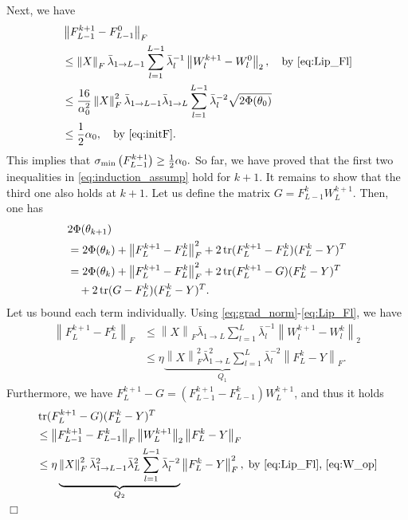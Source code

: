 \documentclass{article}
\newenvironment{proof}{\par\noindent{\bf Proof:\ }}{\hfill$\Box$\\[2mm]}
\newcommand{\norm}[1]{\left\|#1\right\|}
\newcommand{\svmin}[1]{\sigma_{\rm min}\left(#1\right)}
\def\tr{\mathop{\rm tr}\nolimits}
\begin{document}
\begin{proof}
    Next, we have
    \begin{align*}
	&\norm{F_{L-1}^{k+1}-F_{L-1}^0}_F\\
	&\leq\norm{X}_F \bar{\lambda}_{1\to L-1} \sum_{l=1}^{L-1} \bar{\lambda}_l^{-1} \norm{W_l^{k+1}-W_l^0}_2,\quad \textrm{by \eqref{eq:Lip_Fl}}\\
	&\leq\frac{16}{\alpha_0^2}\norm{X}_F^2 \bar{\lambda}_{1\to L-1} \bar{\lambda}_{1\to L} \sum_{l=1}^{L-1} \bar{\lambda}_l^{-2} \sqrt{2\Phi(\theta_0)} \\
	&\leq\frac{1}{2} \alpha_0, \quad \textrm{by \eqref{eq:initF}}.
    \end{align*}
    This implies that $\svmin{F_{L-1}^{k+1}}\geq \frac{1}{2}\alpha_0.$
    So far, we have proved that the first two inequalities in \eqref{eq:induction_assump} hold for $k+1.$
    It remains to show that the third one also holds at $k+1.$
    Let us define the matrix $G=F_{L-1}^k W_L^{k+1}.$  
    Then, one has
    \begin{align*}
	&2\Phi(\theta_{k+1})\\
	&= 2\Phi(\theta_k) + \norm{F_L^{k+1}-F_L^k}_F^2 + 2\tr(F_L^{k+1}-F_L^k)(F_L^k-Y)^T\\
	&= 2\Phi(\theta_k) + \norm{F_L^{k+1}-F_L^k}_F^2 + 2\tr(F_L^{k+1}-G)(F_L^k-Y)^T\\
	&\quad + 2\tr(G-F_L^k)(F_L^k-Y)^T .
    \end{align*}
    Let us bound each term individually. 
    Using \eqref{eq:grad_norm}-\eqref{eq:Lip_Fl}, we have
    \begin{align*}
	\norm{F_L^{k+1}-F_L^k}_F
	&\leq\norm{X}_F \bar{\lambda}_{1\to L} \sum_{l=1}^{L} \bar{\lambda}_l^{-1} \norm{W_l^{k+1}-W_l^k}_2\\
	&\leq \eta \underbrace{\norm{X}_F^2 \bar{\lambda}_{1\to L}^2 \sum_{l=1}^{L} \bar{\lambda}_l^{-2}}_{Q_1} \norm{F_L^k-Y}_F .
    \end{align*}
    Furthermore, we have $F_L^{k+1}-G=(F_{L-1}^{k+1}-F_{L-1}^{k})W_L^{k+1}$, and thus it holds
    \begin{align*}
	&\tr(F_L^{k+1}-G)(F_L^k-Y)^T\\
	&\leq \norm{F_{L-1}^{k+1}-F_{L-1}^k}_F \norm{W_L^{k+1}}_2 \norm{F_L^k-Y}_F \\
	&\leq \eta \underbrace{\norm{X}_F^2 \bar{\lambda}_{1\to L-1}^2 \bar{\lambda}_L^2 \sum_{l=1}^{L-1} \bar{\lambda}_l^{-2}}_{Q_2} \norm{F_L^k-Y}_F^2,\; \textrm{by \eqref{eq:Lip_Fl}, \eqref{eq:W_op}}

\end{align*}
\end{proof}
\end{document}
